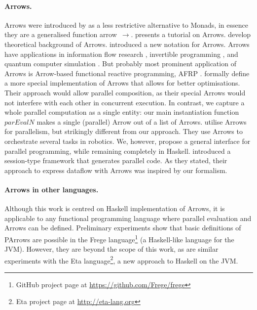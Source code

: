 \documentclass{jfp1}
\newcommand{\Varid}[1]{\mathit{#1}}
\renewcommand{\cite}[1]{\citep{#1}}
\begin{document}
\paragraph{Arrows.}
Arrows were introduced by \citet{HughesArrows} as a less restrictive alternative to Monads, in essence they are a generalised function arrow~\ensuremath{\to }. \citet{Hughes2005} presents a tutorial on Arrows. \citet{jacobs_heunen_hasuo_2009,LINDLEY201197,ATKEY201119} develop theoretical background of Arrows. \citet{Paterson:2001:NNA:507669.507664} introduced a new notation for Arrows. Arrows have applications in information flow research \cite{1648705,LI20101974,Russo:2008:LLI:1411286.1411289}, invertible programming \cite{Alimarine:2005:BAA:1088348.1088357}, and quantum computer simulation \cite{vizzotto_altenkirch_sabry_2006}. But probably most prominent application of Arrows is Arrow-based functional reactive programming, AFRP \cite{Nilsson:2002:FRP:581690.581695,Hudak2003,Czaplicki:2013:AFR:2499370.2462161}.
\citet{Liu:2009:CCA:1631687.1596559} formally define a more special
implementation of Arrows that allows for better optimisations.
Their approach would allow parallel composition, as their special Arrows would not interfere with each other in concurrent execution. In contrast, we capture a whole parallel computation as a single entity: our main instantiation function \ensuremath{\Varid{parEvalN}} makes a single (parallel) Arrow out of a list of Arrows. \citet{Huang2007} utilise Arrows for parallelism, but strikingly different from our approach. They use Arrows to orchestrate several tasks in robotics. We, however, propose a general interface for parallel programming, while remaining completely in Haskell.
\citet{zhang_session_2019} introduced a session-type framework that generates parallel code. As they stated, their approach to express dataflow with Arrows was inspired by our formalism.

\paragraph{Arrows in other languages.}
Although this work is centred on Haskell implementation of Arrows, it is applicable to any functional programming language where parallel evaluation and Arrows can be defined. Preliminary experiments show that basic definitions of PArrows are possible in the Frege language\footnote{GitHub project page at \url{https://github.com/Frege/frege}} (a Haskell-like language for the JVM). However, they are beyond the scope of this work, as are similar experiments with the Eta language\footnote{Eta project page at \url{http://eta-lang.org}}, 
a new approach to Haskell on the JVM.
\end{document}
